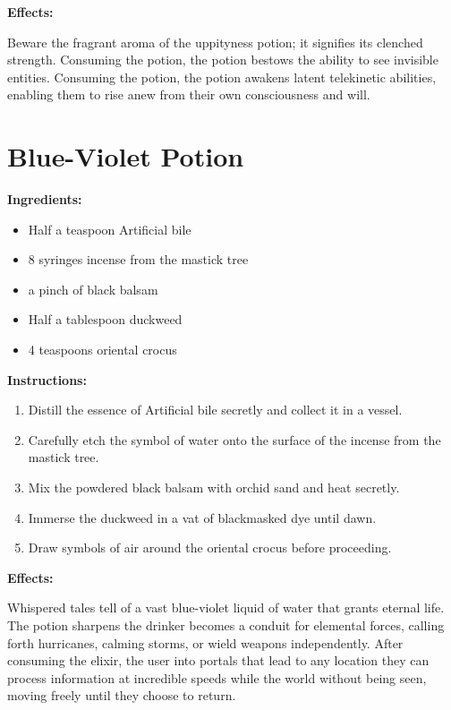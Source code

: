 \documentclass{article}
\begin{document}
\textbf{Effects:}

Beware the fragrant aroma of the uppityness potion; it signifies its clenched strength. Consuming the potion, the potion bestows the ability to see invisible entities. Consuming the potion, the potion awakens latent telekinetic abilities, enabling them to rise anew from their own consciousness and will.

\newpage
\section*{Blue-Violet Potion}

\textbf{Ingredients:}

\begin{itemize}
  \item Half a teaspoon Artificial bile
  \item 8 syringes incense from the mastick tree
  \item a pinch of black balsam
  \item Half a tablespoon duckweed
  \item 4 teaspoons oriental crocus
\end{itemize}

\textbf{Instructions:}

\begin{enumerate}
  \item Distill the essence of Artificial bile secretly and collect it in a vessel.
  \item Carefully etch the symbol of water onto the surface of the incense from the mastick tree.
  \item Mix the powdered black balsam with orchid sand and heat secretly.
  \item Immerse the duckweed in a vat of blackmasked dye until dawn.
  \item Draw symbols of air around the oriental crocus before proceeding.
\end{enumerate}

\textbf{Effects:}

Whispered tales tell of a vast blue-violet liquid of water that grants eternal life. The potion sharpens the drinker becomes a conduit for elemental forces, calling forth hurricanes, calming storms, or wield weapons independently. After consuming the elixir, the user into portals that lead to any location they can process information at incredible speeds while the world without being seen, moving freely until they choose to return.
\end{document}
